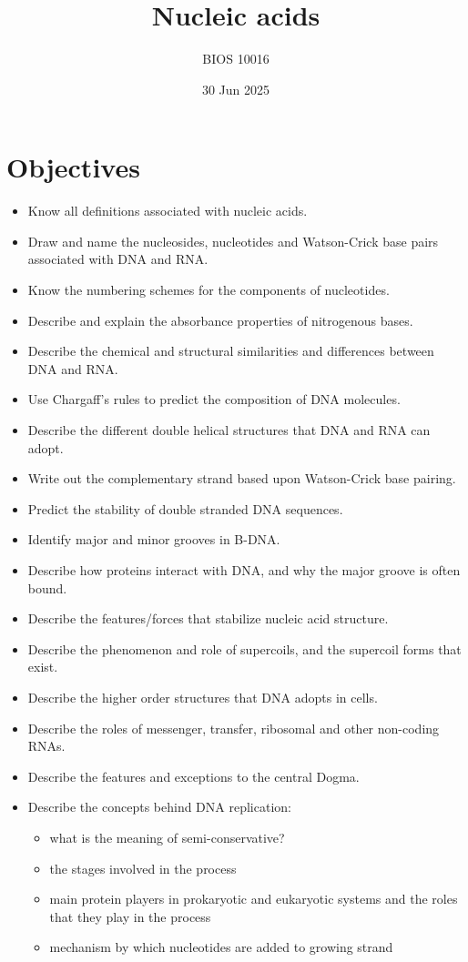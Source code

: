 \documentclass[letterpaper, 12pt]{article}
\title{Nucleic acids}
\author{BIOS 10016}
\date{30 Jun 2025}
\begin{document}
\maketitle

\section*{Objectives}

\begin{itemize}
\item Know all definitions associated with nucleic acids.
\item Draw and name the nucleosides, nucleotides and Watson-Crick base pairs associated with DNA and RNA.
\item Know the numbering schemes for the components of nucleotides.
\item Describe and explain the absorbance properties of nitrogenous bases.
\item Describe the chemical and structural similarities and differences between DNA and RNA.
\item Use Chargaff’s rules to predict the composition of DNA molecules.
\item Describe the different double helical structures that DNA and RNA can adopt.
\item Write out the complementary strand based upon Watson-Crick base pairing.
\item Predict the stability of double stranded DNA sequences.
\item Identify major and minor grooves in B-DNA.
\item Describe how proteins interact with DNA, and why the major groove is often bound.
\item Describe the features/forces that stabilize nucleic acid structure.
\item Describe the phenomenon and role of supercoils, and the supercoil forms that exist.
\item Describe the higher order structures that DNA adopts in cells.
\item Describe the roles of messenger, transfer, ribosomal and other non-coding RNAs.
\item Describe the features and exceptions to the central Dogma.
\item Describe the concepts behind DNA replication:
\begin{itemize}
\item what is the meaning of semi-conservative?
\item the stages involved in the process
\item main protein players in prokaryotic and eukaryotic systems and
the roles that they play in the process
\item mechanism by which nucleotides are added to growing strand
\end{itemize}
\end{itemize}
\end{document}
